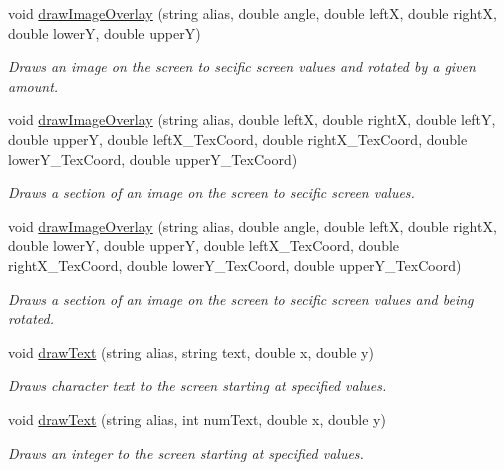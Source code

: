 \begin{CompactItemize}
void \hyperlink{class_resource_mgr_5294405787589cf25735ba6880e50ab5}{drawImageOverlay} (string alias, double angle, double leftX, double rightX, double lowerY, double upperY)
\begin{CompactList}\small\item\em Draws an image on the screen to secific screen values and rotated by a given amount. \item\end{CompactList}\item 
void \hyperlink{class_resource_mgr_49b84d0374dd148dd3da6924470950df}{drawImageOverlay} (string alias, double leftX, double rightX, double leftY, double upperY, double leftX\_\-TexCoord, double rightX\_\-TexCoord, double lowerY\_\-TexCoord, double upperY\_\-TexCoord)
\begin{CompactList}\small\item\em Draws a section of an image on the screen to secific screen values. \item\end{CompactList}\item 
void \hyperlink{class_resource_mgr_e6490546240c374d9886751f2f4cba80}{drawImageOverlay} (string alias, double angle, double leftX, double rightX, double lowerY, double upperY, double leftX\_\-TexCoord, double rightX\_\-TexCoord, double lowerY\_\-TexCoord, double upperY\_\-TexCoord)
\begin{CompactList}\small\item\em Draws a section of an image on the screen to secific screen values and being rotated. \item\end{CompactList}\item 
void \hyperlink{class_resource_mgr_4660091df459dc3d0932663aa9156591}{drawText} (string alias, string text, double x, double y)
\begin{CompactList}\small\item\em Draws character text to the screen starting at specified values. \item\end{CompactList}\item 
void \hyperlink{class_resource_mgr_410b4d2bae7cd991d1f7095a7458ec30}{drawText} (string alias, int numText, double x, double y)
\begin{CompactList}\small\item\em Draws an integer to the screen starting at specified values. \item\end{CompactList}\item 

\end{CompactItemize}
